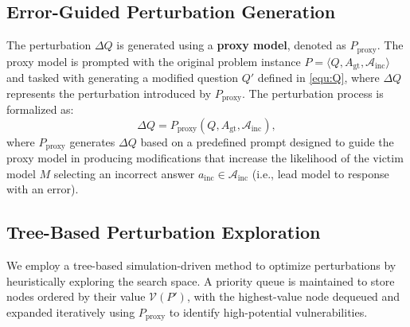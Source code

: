 


\subsection{Error-Guided Perturbation Generation}

The perturbation \( \Delta Q \) is generated using a \textbf{proxy model}, denoted as \( P_\text{proxy} \). The proxy model is prompted with the original problem instance \( P = \langle Q, A_\text{gt}, \mathcal{A}_\text{inc} \rangle \) and tasked with generating a modified question \( Q' \) defined in \autoref{equ:Q}, where \( \Delta Q \) represents the perturbation introduced by \( P_\text{proxy} \). The perturbation process is formalized as:
\begin{equation}
\Delta Q = P_\text{proxy}(Q, A_\text{gt}, \mathcal{A}_\text{inc}),
\end{equation}
where \( P_\text{proxy} \) generates \( \Delta Q \) based on a predefined prompt designed to guide the proxy model in producing modifications that increase the likelihood of the victim model \( M \) selecting an incorrect answer \( a_\text{inc} \in \mathcal{A}_\text{inc} \) (i.e., lead model to response with an error).




\subsection{Tree-Based Perturbation Exploration}
\label{sec:value_function}
We employ a tree-based simulation-driven method to optimize perturbations by heuristically exploring the search space. A priority queue is maintained to store nodes ordered by their value \( \mathcal{V}(P') \), with the highest-value node dequeued and expanded iteratively using \( P_\text{proxy} \) to identify high-potential vulnerabilities.

